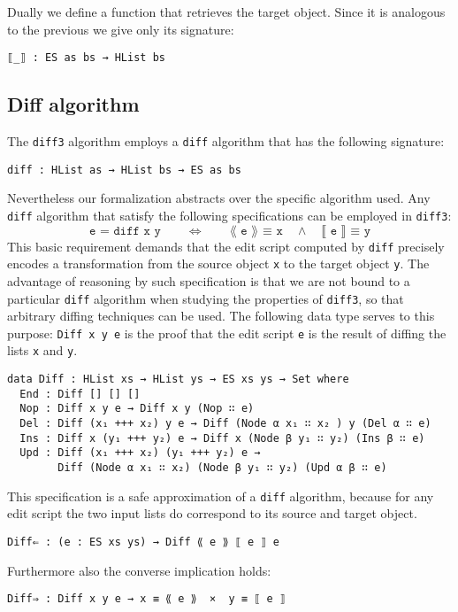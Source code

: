 \documentclass[preprint]{sigplanconf}
\begin{document}
	Dually we define a function that retrieves the target object.
	Since it is analogous to the previous we give only its signature:
	
\begin{verbatim}
⟦_⟧ : ES as bs → HList bs
\end{verbatim}

	\subsection{Diff algorithm}
        \label{subsec:diff-algo}
	The \texttt{diff3} algorithm employs a \texttt{diff} algorithm that has the 
	following	signature:
\begin{verbatim}
diff : HList as → HList bs → ES as bs
\end{verbatim}
        Nevertheless our formalization abstracts over the specific algorithm
        used. Any \texttt{diff} algorithm that satisfy the following specifications
        can be employed in \texttt{diff3}:
\[ \texttt{e = diff x y} \qquad \Leftrightarrow \qquad \texttt{⟪ e ⟫ ≡ x} \quad \land \quad  \texttt{⟦ e ⟧ ≡ y} \]
	This basic requirement demands that the edit script computed by 
	\texttt{diff} precisely encodes a transformation from the source object 
	\texttt{x} to the target object \texttt{y}.
	The advantage of reasoning by such specification is that we are not bound
	to a particular \texttt{diff} algorithm when studying the properties of 
	\texttt{diff3}, so that arbitrary diffing techniques can be used.
        The following data type serves to this purpose: \texttt{Diff x y e} is the 
        proof that the edit script \texttt{e} is the result of diffing the lists 
        \texttt{x} and \texttt{y}.
\begin{verbatim}
data Diff : HList xs → HList ys → ES xs ys → Set where
  End : Diff [] [] []
  Nop : Diff x y e → Diff x y (Nop ∷ e)
  Del : Diff (x₁ +++ x₂) y e → Diff (Node α x₁ ∷ x₂ ) y (Del α ∷ e)
  Ins : Diff x (y₁ +++ y₂) e → Diff x (Node β y₁ ∷ y₂) (Ins β ∷ e)
  Upd : Diff (x₁ +++ x₂) (y₁ +++ y₂) e → 
        Diff (Node α x₁ ∷ x₂) (Node β y₁ ∷ y₂) (Upd α β ∷ e)
\end{verbatim}
        This specification  is a safe approximation of a \texttt{diff} algorithm,
        because for any edit script the two input lists do correspond to its
        source and target object.
\begin{verbatim}
Diff⇐ : (e : ES xs ys) → Diff ⟪ e ⟫ ⟦ e ⟧ e
\end{verbatim}
        Furthermore also the converse implication holds:
\begin{verbatim}
Diff⇒ : Diff x y e → x ≡ ⟪ e ⟫  ×  y ≡ ⟦ e ⟧
\end{verbatim}
\end{document}
